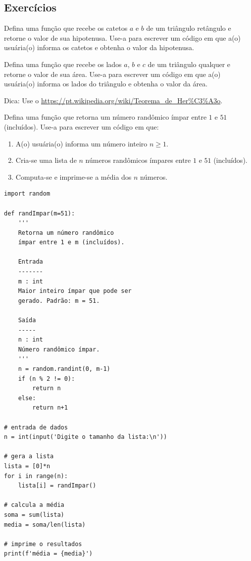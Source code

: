 \subsection{Exercícios}

\begin{exer}
  Defina uma função que recebe os catetos $a$ e $b$ de um triângulo retângulo e retorne o valor de sua hipotenusa. Use-a para escrever um código em que a(o) usuária(o) informa os catetos e obtenha o valor da hipotenusa.
\end{exer}

\begin{exer}
  Defina uma função que recebe os lados $a$, $b$ e $c$ de um triângulo qualquer e retorne o valor de sua área. Use-a para escrever um código em que a(o) usuária(o) informa os lados do triângulo e obtenha o valor da área.  
\end{exer}
\begin{resp}
  Dica: Use o \href{Teorema de Heron}{https://pt.wikipedia.org/wiki/Teorema\_de\_Her\%C3\%A3o}.
\end{resp}

\begin{exer}
  Defina uma função que retorna um número randômico ímpar entre $1$ e $51$ (incluídos). Use-a para escrever um código em que:
  \begin{enumerate}[1.]
  \item A(o) usuária(o) informa um número inteiro $n\geq 1$.
  \item Cria-se uma lista de $n$ números randômicos ímpares entre $1$ e $51$ (incluídos).
  \item Computa-se e imprime-se a média dos $n$ números.
  \end{enumerate}
\end{exer}
\begin{resp}
\begin{lstlisting}
import random

def randImpar(m=51):
    '''
    Retorna um número randômico
    ímpar entre 1 e m (incluídos).

    Entrada
    -------
    m : int
    Maior inteiro ímpar que pode ser 
    gerado. Padrão: m = 51.

    Saída
    -----
    n : int
    Número randômico ímpar.
    '''
    n = random.randint(0, m-1)
    if (n % 2 != 0):
        return n
    else:
        return n+1

# entrada de dados
n = int(input('Digite o tamanho da lista:\n'))

# gera a lista
lista = [0]*n
for i in range(n):
    lista[i] = randImpar()

# calcula a média
soma = sum(lista)
media = soma/len(lista)

# imprime o resultados
print(f'média = {media}')
\end{lstlisting}
\end{resp}

